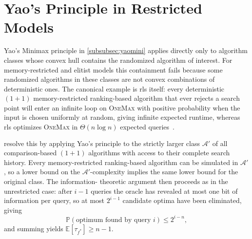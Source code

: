 \section{Yao's Principle in Restricted Models}
\label{app:yao-restricted}

Yao's Minimax principle in \ref{subsubsec:yaomini} applies directly only to
algorithm classes whose convex hull contains the randomized algorithm
of interest. For memory-restricted and elitist models this containment
fails because some randomized algorithms in these classes are not
convex combinations of deterministic ones. The canonical example is
\acrshort{rls} itself: every deterministic $(1+1)$ memory-restricted
ranking-based algorithm that ever rejects a search point will enter an
infinite loop on \textsc{OneMax} with positive probability when the
input is chosen uniformly at random, giving infinite expected runtime,
whereas \acrshort{rls} optimizes \textsc{OneMax} in $\Theta(n \log n)$
expected queries~\cite{doerr2015onemax}.

\citet{doerr2015onemax} resolve this by applying Yao's principle to
the strictly larger class $\mathcal{A}'$ of all comparison-based
$(1+1)$ algorithms with access to their complete search history.
Every memory-restricted ranking-based algorithm can be simulated in
$\mathcal{A}'$, so a lower bound on the $\mathcal{A}'$-complexity
implies the same lower bound for the original class. The information-
theoretic argument then proceeds as in the unrestricted case: after
$i - 1$ queries the oracle has revealed at most one bit of information
per query, so at most $2^{i-1}$ candidate optima have been eliminated,
giving
\[
  \mathbb{P}(\text{optimum found by query } i) \leq 2^{i - n},
\]
and summing yields $\mathbb{E}[\tau_{f^*}] \geq n - 1$.
